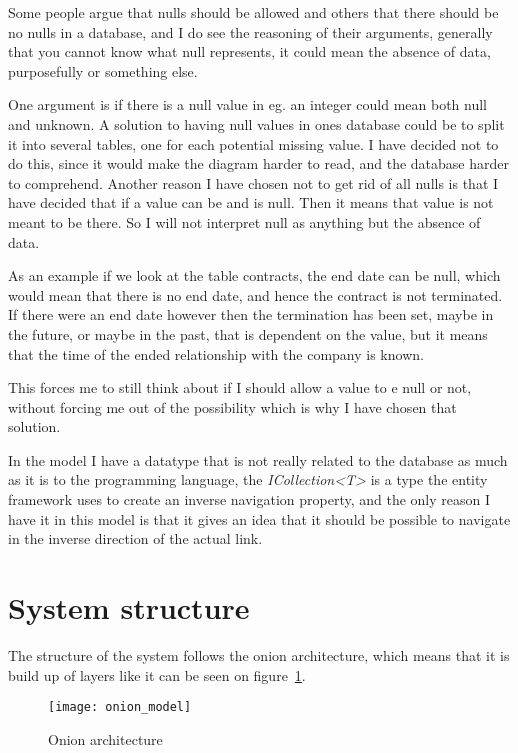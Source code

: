 Some people argue that nulls should be allowed and others that there should be no nulls in a database\cite{stackexchange:db:nullfields}, and I do see the reasoning of their arguments, generally that you cannot know what null represents, it could mean the absence of data, purposefully or something else.

One argument is if there is a null value in eg. an integer could mean both null and unknown. A solution to having null values in ones database could be to split it into several tables, one for each potential missing value. I have decided not to do this, since it would make the diagram harder to read, and the database harder to comprehend. Another reason I have chosen not to get rid of all nulls is that I have decided that if a value can be and is null. Then it means that value is not meant to be there. So I will not interpret null as anything but the absence of data.

As an example if we look at the table contracts, the end date can be null, which would mean that there is no end date, and hence the contract is not terminated. If there were an end date however then the termination has been set, maybe in the future, or maybe in the past, that is dependent on the value, but it means that the time of the ended relationship with the company is known.

This forces me to still think about if I should allow a value to e null or not, without forcing me out of the possibility which is why I have chosen that solution.

In the model I have a datatype that is not really related to the database as much as it is to the programming language, the \textit{ICollection<T>} is a type the entity framework uses to create an inverse navigation property, and the only reason I have it in this model is that it gives an idea that it should be possible to navigate in the inverse direction of the actual link.

\section{System structure}
\label{sec:System structure}
The structure of the system follows the onion architecture\cite{onion_architecture}, which means that it is build up of layers like it can be seen on figure~\ref{fig:Onion architecture}.

\begin{figure}[h]
  \centering
  \texttt{[image: onion\_model]}
  \caption[Onion architecture]{Onion architecture\protect\footnotemark}
  \label{fig:Onion architecture}
\end{figure}

